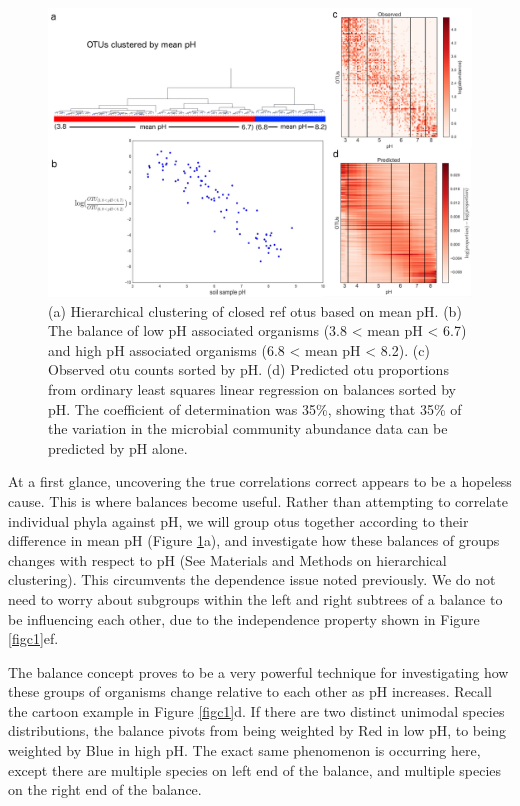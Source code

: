  \begin{figure}[H]
        \centering
        \includegraphics[width=1\textwidth]{ch3/Figure2.pdf}
        \caption[The application of balances on a soil microbial dataset to identify
          microbial partitioning with respect to pH.]
        {(a) Hierarchical clustering of closed ref \gls{otu}s based on mean pH. (b) The balance of low pH associated organisms (3.8 < mean pH < 6.7) and high pH associated organisms (6.8 < mean pH < 8.2). (c) Observed \gls{otu} counts sorted by pH. (d) Predicted \gls{otu} proportions from ordinary least squares linear regression on balances sorted by pH. The coefficient of determination was 35\%, showing that 35\% of the variation in the microbial community abundance data can be predicted by pH alone.}
        \label{figc2}
 \end{figure}
 At a first glance, uncovering the true correlations correct appears to be a hopeless cause.  This is where balances become useful.  Rather than attempting to correlate individual phyla against pH, we will group \gls{otu}s together according to their difference in mean pH (Figure \ref{figc2}a), and investigate how these balances of groups changes with respect to pH (See Materials and Methods on hierarchical clustering).  This circumvents the dependence issue noted previously.  We do not need to worry about subgroups within the left and right subtrees of a balance to be influencing each other, due to the independence property shown in Figure \ref{figc1}ef.  \par
 The balance concept proves to be a very powerful technique for investigating how these groups of organisms change relative to each other as pH increases.  Recall the cartoon example in Figure \ref{figc1}d.  If there are two distinct unimodal species distributions, the balance pivots from being weighted by Red in low pH, to being weighted by Blue in high pH.  The exact same phenomenon is occurring here, except there are multiple species on left end of the balance, and multiple species on the right end of the balance.\par
